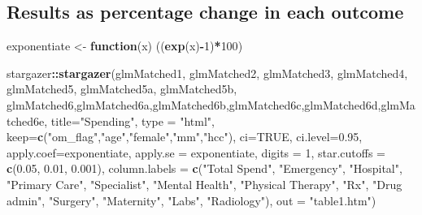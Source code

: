 \documentclass[]{article}
\newenvironment{Shaded}{\begin{snugshade}}{\end{snugshade}}
\newcommand{\KeywordTok}[1]{\textcolor[rgb]{0.13,0.29,0.53}{\textbf{#1}}}
\newcommand{\DataTypeTok}[1]{\textcolor[rgb]{0.13,0.29,0.53}{#1}}
\newcommand{\DecValTok}[1]{\textcolor[rgb]{0.00,0.00,0.81}{#1}}
\newcommand{\FloatTok}[1]{\textcolor[rgb]{0.00,0.00,0.81}{#1}}
\newcommand{\StringTok}[1]{\textcolor[rgb]{0.31,0.60,0.02}{#1}}
\newcommand{\OtherTok}[1]{\textcolor[rgb]{0.56,0.35,0.01}{#1}}
\newcommand{\ControlFlowTok}[1]{\textcolor[rgb]{0.13,0.29,0.53}{\textbf{#1}}}
\newcommand{\OperatorTok}[1]{\textcolor[rgb]{0.81,0.36,0.00}{\textbf{#1}}}
\newcommand{\NormalTok}[1]{#1}
\begin{document}
\subsection{Results as percentage change in each
outcome}\label{results-as-percentage-change-in-each-outcome}

\begin{Shaded}
\begin{Highlighting}[]
\NormalTok{exponentiate <-}\StringTok{ }\ControlFlowTok{function}\NormalTok{(x) ((}\KeywordTok{exp}\NormalTok{(x)}\OperatorTok{-}\DecValTok{1}\NormalTok{)}\OperatorTok{*}\DecValTok{100}\NormalTok{)}

\NormalTok{stargazer}\OperatorTok{::}\KeywordTok{stargazer}\NormalTok{(glmMatched1, glmMatched2, glmMatched3, glmMatched4, glmMatched5, glmMatched5a, glmMatched5b, glmMatched6,glmMatched6a,glmMatched6b,glmMatched6c,glmMatched6d,glmMatched6e,}
          \DataTypeTok{title=}\StringTok{"Spending"}\NormalTok{, }
          \DataTypeTok{type =} \StringTok{"html"}\NormalTok{,}
          \DataTypeTok{keep=}\KeywordTok{c}\NormalTok{(}\StringTok{"om_flag"}\NormalTok{,}\StringTok{"age"}\NormalTok{,}\StringTok{"female"}\NormalTok{,}\StringTok{"mm"}\NormalTok{,}\StringTok{"hcc"}\NormalTok{),}
          \DataTypeTok{ci=}\OtherTok{TRUE}\NormalTok{, }\DataTypeTok{ci.level=}\FloatTok{0.95}\NormalTok{,}
          \DataTypeTok{apply.coef=}\NormalTok{exponentiate, }\DataTypeTok{apply.se =}\NormalTok{ exponentiate,}
          \DataTypeTok{digits =} \DecValTok{1}\NormalTok{, }
          \DataTypeTok{star.cutoffs =} \KeywordTok{c}\NormalTok{(}\FloatTok{0.05}\NormalTok{, }\FloatTok{0.01}\NormalTok{, }\FloatTok{0.001}\NormalTok{),}
          \DataTypeTok{column.labels =} \KeywordTok{c}\NormalTok{(}\StringTok{"Total Spend"}\NormalTok{, }\StringTok{"Emergency"}\NormalTok{, }\StringTok{"Hospital"}\NormalTok{, }\StringTok{"Primary Care"}\NormalTok{, }\StringTok{"Specialist"}\NormalTok{, }\StringTok{"Mental Health"}\NormalTok{, }\StringTok{"Physical Therapy"}\NormalTok{, }\StringTok{"Rx"}\NormalTok{, }\StringTok{"Drug admin"}\NormalTok{, }\StringTok{"Surgery"}\NormalTok{, }\StringTok{"Maternity"}\NormalTok{, }\StringTok{"Labs"}\NormalTok{, }\StringTok{"Radiology"}\NormalTok{),}
          \DataTypeTok{out =} \StringTok{"table1.htm"}\NormalTok{)}
\end{Highlighting}
\end{Shaded}
\end{document}
